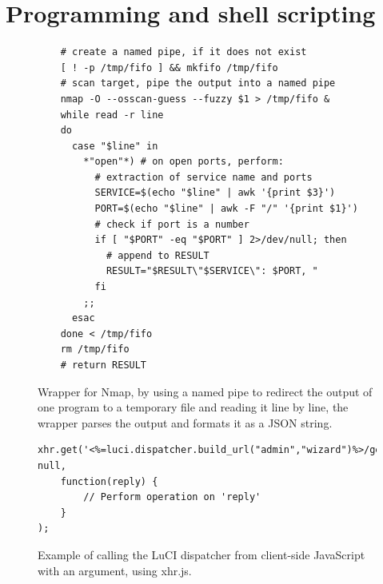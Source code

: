 \documentclass[a4paper,11pt,makeidx]{kth-bcs}
\begin{document}
\chapter{Programming and shell scripting}\label{appB}
   \begin{figure}[ht]
      \centering
      \lstset{language=sh}
      \begin{lstlisting}
    # create a named pipe, if it does not exist
    [ ! -p /tmp/fifo ] && mkfifo /tmp/fifo
    # scan target, pipe the output into a named pipe
    nmap -O --osscan-guess --fuzzy $1 > /tmp/fifo &
    while read -r line
    do
      case "$line" in
        *"open"*) # on open ports, perform:
          # extraction of service name and ports
          SERVICE=$(echo "$line" | awk '{print $3}')
          PORT=$(echo "$line" | awk -F "/" '{print $1}')
          # check if port is a number
          if [ "$PORT" -eq "$PORT" ] 2>/dev/null; then
            # append to RESULT
            RESULT="$RESULT\"$SERVICE\": $PORT, "
          fi
        ;;
      esac
    done < /tmp/fifo
    rm /tmp/fifo
    # return RESULT
      \end{lstlisting}
      \caption{
         \small{
Wrapper for Nmap, by using a named pipe to redirect the output of one program to a temporary file and reading it line by line, the wrapper parses the output and formats it as a JSON string.
         }
      }
      \label{fig:fifo}
   \end{figure}

   \begin{figure}[h!]
   \centering
      \lstset{language=java}
      \begin{lstlisting}
xhr.get('<%=luci.dispatcher.build_url("admin","wizard")%>/get_list/'+argument, null,
    function(reply) {
        // Perform operation on 'reply'
    }
);
      \end{lstlisting}
      \caption{
         \small{
Example of calling the LuCI dispatcher from client-side JavaScript with an argument, using xhr.js.
         }
      }
      \label{fig:javascript}
   \end{figure}
\end{document}
